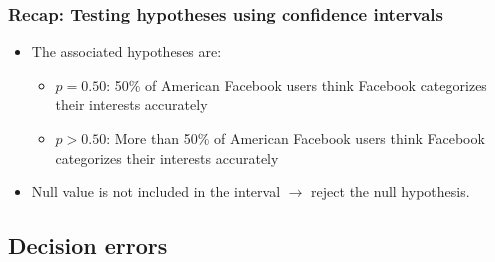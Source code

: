\documentclass[t,compress,mathserif]{beamer}
\begin{document}
\begin{frame}
\frametitle{Recap: Testing hypotheses using confidence intervals}

{\small {}}

\begin{itemize}

\item The associated hypotheses are:
\begin{itemize}
\item[$H_0$:] $p = 0.50$: 50\% of American Facebook users think Facebook categorizes their interests accurately
\item[$H_A$:] $p > 0.50$: More than 50\% of American Facebook users think Facebook categorizes their interests accurately
\end{itemize}

\item Null value is not included in the interval $\rightarrow$ reject the null hypothesis.


\end{itemize}

\end{frame}





\subsection{Decision errors}






\end{document}

